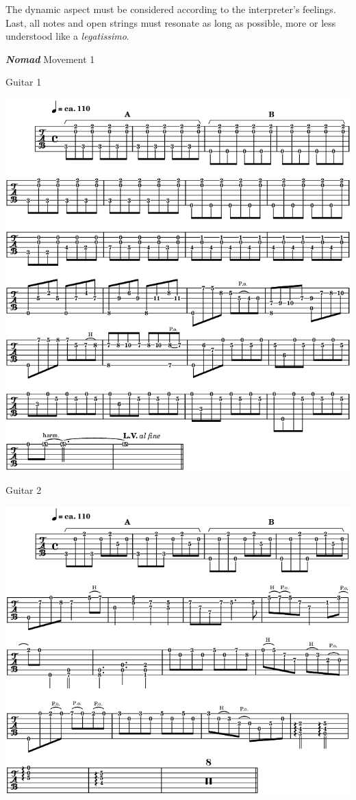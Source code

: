 The dynamic aspect must be considered according to the interpreter's feelings. Last, all notes and open strings must resonate as long as possible, more or less understood like a \textit{legatissimo}.
\newpage

 \quad \textbf{\textsl{Nomad}} Movement 1 

\smallskip

 \quad \quad Guitar 1

\begin{center}
\includegraphics[scale=0.5]{img/neA1}
\end{center}

 \quad \quad Guitar 2

\begin{center}
\includegraphics[scale=0.5]{img/neA2}
\end{center}

